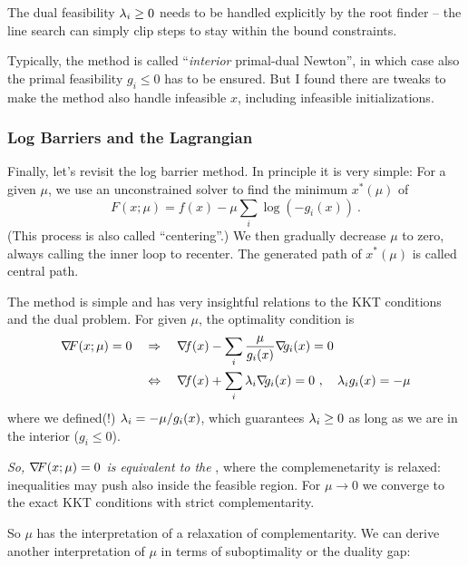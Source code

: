 The dual feasibility $\lambda_i \ge 0$ needs to be handled explicitly by
the root finder -- the line search can simply clip steps to stay
within the bound constraints.

Typically, the method is called ``\emph{interior} primal-dual
Newton'', in which case also the primal feasibility $g_i \le 0$ has to
be ensured. But I found there are tweaks to make the method also handle
infeasible $x$, including infeasible initializations.


\subsubsection{Log Barriers and the Lagrangian}

Finally, let's revisit the log barrier method. In principle it is very simple: For a given $\mu$, we use an unconstrained solver to find the minimum $x^*(\mu)$ of
\begin{equation}
F(x;\mu) = f(x) - \mu \sum_i \log(-g_i(x)) ~.
\end{equation}
(This process is also called ``centering''.) We then gradually decrease $\mu$ to zero, always calling the inner loop to recenter. The generated path of $x^*(\mu)$ is called central path.

The method is simple and has very insightful relations to the KKT conditions and the dual problem. For given $\mu$, the optimality condition is
\begin{align}
\na F(x;\mu) = 0
 \quad&\To\quad \na f(x) - \sum_i \frac{\mu}{g_i(x)} \na g_i(x) = 0 \\
&\oTo\quad \na f(x) + \sum_i \l_i \na g_i(x) = 0 \comma \l_i g_i(x) = -\mu
\end{align}
where we defined(!) $\lambda_i = -\mu/g_i(x)$, which guarantees $\lambda_i \ge 0$ as long as we are in the interior ($g_i\le 0$).

\emph{So, ${\nabla_{\!\!}} F(x;\mu) = 0$ is equivalent to the }, where the complemenetarity is
relaxed: inequalities may push also inside the feasible region. For
$\mu\to 0$ we converge to the exact KKT conditions with strict
complementarity.

So $\mu$ has the interpretation of a relaxation of complementarity. We
can derive another interpretation of $\mu$ in terms of suboptimality
or the duality gap:

